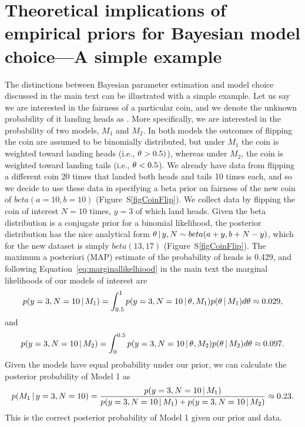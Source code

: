 \section{Theoretical implications of empirical priors for Bayesian model
choice---A simple example}
\begin{linenomath}
The distinctions between Bayesian parameter estimation and model choice
discussed in the main text can be illustrated with a simple example.
Let us say we are interested in the fairness of a particular coin, and we
denote the unknown probability of it landing heads as \myTheta{}.
More specifically, we are interested in the probability of two models, $M_1$
and $M_2$.
In both models the outcomes of flipping the coin are assumed to be binomially
distributed, but under $M_1$ the coin is weighted toward landing heads (i.e.,
$\theta_{} > 0.5)$), whereas under $M_2$, the coin is weighted toward landing
tails (i.e., $\theta_{} < 0.5$).
We already have data from flipping a different coin 20 times that landed both
heads and tails 10 times each, and so we decide to use these data in specifying
a beta prior on fairness of the new coin of $beta(a=10, b=10)$
(Figure~S\ref{figCoinFlip}).
We collect data by flipping the coin of interest $N=10$ times, $y=3$ of which
land heads.
Given the beta distribution is a conjugate prior for a binomial likelihood, the
posterior distribution has the nice analytical form $\theta \,|\, y,N \sim
beta(a + y, b + N - y)$, which for the new dataset is simply $beta(13, 17)$
(Figure~S\ref{figCoinFlip}).
The maximum a posteriori (MAP) estimate of the probability of heads is 0.429,
and following Equation~\ref{eq:marginallikelhiood} in the main text the
marginal likelihoods of our models of interest are
\begin{equation}
    p(y=3, N=10 \,|\, M_1) = \int_{0.5}^{1} p(y=3, N=10 \,|\,
    \theta_{}, M_1)p(\theta_{} \,|\, M_1) d\theta_{} \approx 0.029,
\end{equation}
and
\begin{equation}
    p(y=3, N=10 \,|\, M_2) = \int_{0}^{0.5} p(y=3, N=10 \,|\,
    \theta_{}, M_2)p(\theta_{} \,|\, M_2) d\theta_{} \approx 0.097.
\end{equation}
Given the models have equal probability under our prior, we can calculate the
posterior probability of Model 1 as
\begin{equation}
    p(M_1 \,|\, y=3, N=10) = \frac{p(y=3, N=10 \,|\, M_1)}{p(y=3, N=10 \,|\,
    M_1) + p(y=3, N=10 \,|\, M_2)} \approx 0.23.
\end{equation}
This is the correct posterior probability of Model 1 given our prior
and data.
\end{linenomath}

